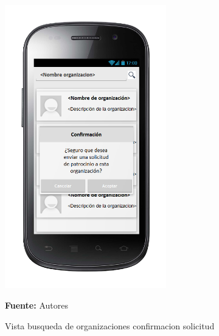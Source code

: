 \begin{figure}[!htb]
  \begin{center}
\includegraphics[width=7cm]{./imagenes/UI/Usuarios/busqueda_de_organizaciones_confirmacion_solicitud.png}
    \caption{Vista busqueda de organizaciones confirmacion solicitud}
    \label{fig:Vista_busqueda_de_organizaciones_confirmacion_solicitud}
    \textbf{Fuente:}  Autores
  \end{center}
\end{figure}

